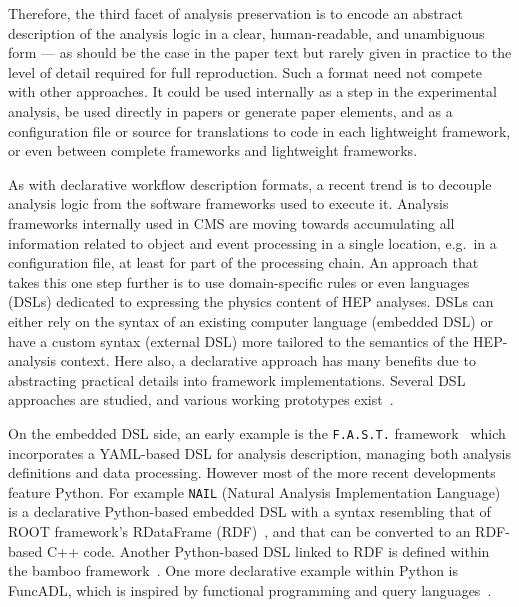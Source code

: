 \documentclass[11pt]{article}
\begin{document}
Therefore, the third facet of analysis preservation is to encode an abstract description of the analysis logic in a clear, human-readable, and unambiguous form --- as should be the case in the paper text but rarely given in practice to the level of detail required for full reproduction. Such a format need not compete with other approaches. It could be used internally as a step in the experimental analysis, be used directly in papers or generate paper elements, and as a configuration file or source for translations to code in each lightweight framework, or even between complete frameworks and lightweight frameworks.

As with declarative workflow description formats, a recent trend is to decouple analysis logic from the software frameworks used to execute it. Analysis frameworks internally used in CMS 
are moving towards accumulating all information related to object and event processing in a single location, e.g.~in a configuration file, at least for part of the processing chain. An approach that takes this one step further is to use domain-specific rules or even languages (DSLs) dedicated to expressing the physics content of HEP analyses. DSLs can either rely on the syntax of an existing computer language (embedded DSL) or have a custom syntax (external DSL) more tailored to the semantics of the HEP-analysis context. Here also, a declarative approach has many benefits due to abstracting practical details into framework implementations. Several DSL approaches are studied, and various working prototypes exist~\cite{Sekmen:2020vph}. 

On the embedded DSL side, an early example is the \texttt{F.A.S.T.} framework~\cite{FAST} which incorporates a YAML-based DSL for analysis description, managing both analysis definitions and data processing. However most of the more recent developments feature Python. For example \texttt{NAIL} (Natural Analysis Implementation Language)~\cite{NAIL} is a declarative Python-based embedded DSL with a syntax resembling that of ROOT framework's RDataFrame (RDF)~\cite{enrico_guiraud_2017_260230}, and that can be converted to an RDF-based C++ code.  Another Python-based DSL linked to RDF is defined within the bamboo framework~\cite{David:2021ohq}.  One more declarative example within Python is FuncADL, which is inspired by functional programming and query languages~\cite{Proffitt:2021wfh}.
\end{document}

